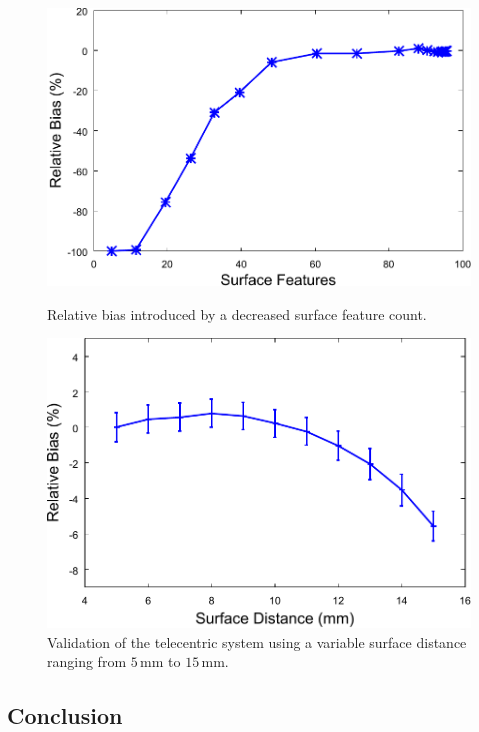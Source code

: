 \documentclass[12pt,a4paper]{article}
\begin{document}
\begin{figure}[htbp]
  \begin{minipage}{0.47\textwidth}
   \centering
    \includegraphics[width=1\textwidth]{figures/mm-squal.pdf}
    \caption{\label{fig:mm-squal}Relative bias introduced by a decreased surface feature count.
    }
  \end{minipage}\hfill
  \begin{minipage}{0.47\textwidth}
   \centering
    \includegraphics[width=1\textwidth]{figures/telec_error}
    \caption{\label{fig:telec_error}Validation of the telecentric system using a variable surface distance ranging from $5\,$mm to $15\,$mm.
}
  \end{minipage}
\end{figure}



\subsection{Conclusion}
\end{document}
